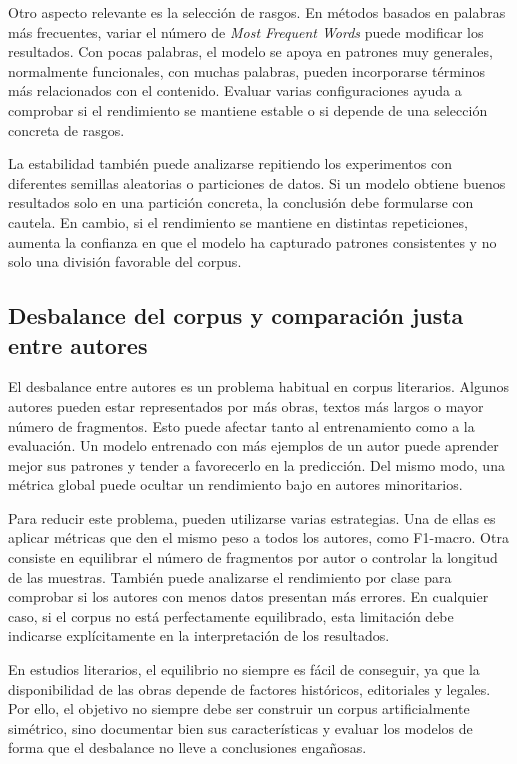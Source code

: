 \documentclass[IB]{TFUOC}%
\begin{document}
Otro aspecto relevante es la selección de rasgos. En métodos basados en palabras más frecuentes, variar el número de \textit{Most Frequent Words} puede modificar los resultados. Con pocas palabras, el modelo se apoya en patrones muy generales, normalmente funcionales, con muchas palabras, pueden incorporarse términos más relacionados con el contenido. Evaluar varias configuraciones ayuda a comprobar si el rendimiento se mantiene estable o si depende de una selección concreta de rasgos.

La estabilidad también puede analizarse repitiendo los experimentos con diferentes semillas aleatorias o particiones de datos. Si un modelo obtiene buenos resultados solo en una partición concreta, la conclusión debe formularse con cautela. En cambio, si el rendimiento se mantiene en distintas repeticiones, aumenta la confianza en que el modelo ha capturado patrones consistentes y no solo una división favorable del corpus.

\subsection{Desbalance del corpus y comparación justa entre autores}

El desbalance entre autores es un problema habitual en corpus literarios. Algunos autores pueden estar representados por más obras, textos más largos o mayor número de fragmentos. Esto puede afectar tanto al entrenamiento como a la evaluación. Un modelo entrenado con más ejemplos de un autor puede aprender mejor sus patrones y tender a favorecerlo en la predicción. Del mismo modo, una métrica global puede ocultar un rendimiento bajo en autores minoritarios.

Para reducir este problema, pueden utilizarse varias estrategias. Una de ellas es aplicar métricas que den el mismo peso a todos los autores, como F1-macro. Otra consiste en equilibrar el número de fragmentos por autor o controlar la longitud de las muestras. También puede analizarse el rendimiento por clase para comprobar si los autores con menos datos presentan más errores. En cualquier caso, si el corpus no está perfectamente equilibrado, esta limitación debe indicarse explícitamente en la interpretación de los resultados.

En estudios literarios, el equilibrio no siempre es fácil de conseguir, ya que la disponibilidad de las obras depende de factores históricos, editoriales y legales. Por ello, el objetivo no siempre debe ser construir un corpus artificialmente simétrico, sino documentar bien sus características y evaluar los modelos de forma que el desbalance no lleve a conclusiones engañosas.
\end{document}
